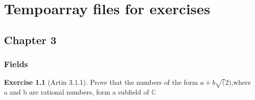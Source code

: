 \documentclass[
]{book}
\theoremstyle{definition}
\theoremstyle{definition}
\theoremstyle{definition}
\newtheorem{exercise}{Exercise}[chapter]
\theoremstyle{definition}
\theoremstyle{remark}
\begin{document}
\hypertarget{tempoarray-files-for-exercises}{%
\chapter{Tempoarray files for exercises}\label{tempoarray-files-for-exercises}}

\hypertarget{chapter-3}{%
\section{Chapter 3}\label{chapter-3}}

\hypertarget{fields-1}{%
\subsection{Fields}\label{fields-1}}

\begin{exercise}[Artin 3.1.1]
\protect\hypertarget{exr:unnamed-chunk-242}{}\label{exr:unnamed-chunk-242}Prove that the numbers of the form \(a + b\sqrt(2)\),where a and b are rational numbers, form a subfield of \(\mathbb{C}\)
\end{exercise}
\end{document}
